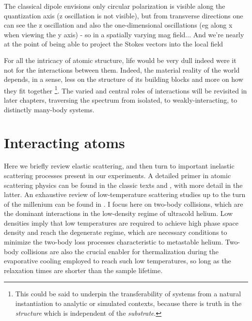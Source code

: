 	

	The classical dipole envisions only circular polarization is visible along the quantization axis (z oscillation is not visible), but from transverse directions one can see the z oscillation and also the one-dimensional oscillations (eg along x when viewing the y axis) - so in a spatially varying mag field...
	And we're nearly at the point of being able to project the Stokes vectors into the local field
	


	
	For all the intricacy of atomic structure, life would be very dull indeed were it not for the interactions between them.
	Indeed, the material reality of the world depends, in a sense, less on the structure of its building blocks and more on how they fit together \footnote{This could be said to underpin the transferability of systems from a natural instantiation to analytic or simulated contexts, because there is truth in the \emph{structure} which is independent of the \emph{substrate}.}.
	The varied and central roles of interactions will be revisited in later chapters, traversing the spectrum from isolated, to weakly-interacting, to distinctly many-body systems.
	


\section{Interacting atoms}

	
	Here we briefly review elastic scattering, and then turn to important inelastic scattering processes present in our experiments.
	A detailed primer in atomic scattering physics can be found in the classic texts \cite{PitaevskiiStringari} and \cite{PethickSmith}, with more detail in the latter.
	An exhaustive review of low-temperature scattering studies up to the turn of the millenium can be found in \cite{Weiner99}.
	I focus here on two-body collisions, which are the dominant interactions in the low-density regime of ultracold helium.
	Low densities imply that low temperatures are required to achieve high phase space density and reach the degenerate regime, which are necessary conditions to minimize the two-body loss processes characteristic to metastable helium.
	Two-body collisions are also the crucial enabler for thermalization during the evaporative cooling employed to reach such low temperatures, so long as the relaxation times are shorter than the sample lifetime.

